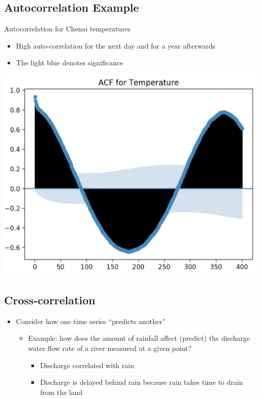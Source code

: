 \documentclass[11pt]{article}
\theoremstyle{definition}
\begin{document}
\subsection{Autocorrelation Example}
Autocorrelation for
Chenai temperatures

\begin{itemize}
  \item High auto-correlation
  for the next day and
  for a year afterwards
  \item The light blue
  denotes significance
\end{itemize}

\includegraphics[width=\textwidth/2]{9.png}

\subsection{Cross-correlation}
\begin{itemize}
  \item Consider how one time
  series “predicts another”
  \begin{itemize}
    \item Example: how does the
    amount of rainfall affect
    (predict) the discharge water
    flow rate of a river measured
    at a given point?
    \begin{itemize}
      \item Discharge correlated with rain
      \item Discharge is delayed behind
      rain because rain takes time
      to drain from the land
    \end{itemize}
  \end{itemize}
\end{itemize}
\end{document}
